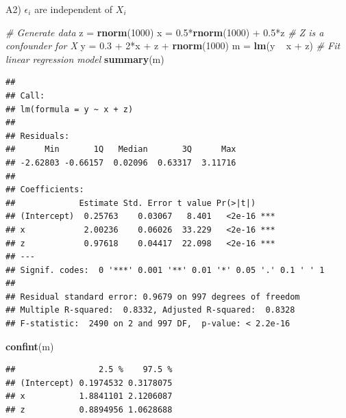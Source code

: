 \documentclass[12pt,ignorenonframetext,]{beamer}
\newenvironment{Shaded}{\begin{snugshade}}{\end{snugshade}}
\newcommand{\KeywordTok}[1]{\textcolor[rgb]{0.13,0.29,0.53}{\textbf{{#1}}}}
\newcommand{\DecValTok}[1]{\textcolor[rgb]{0.00,0.00,0.81}{{#1}}}
\newcommand{\FloatTok}[1]{\textcolor[rgb]{0.00,0.00,0.81}{{#1}}}
\newcommand{\StringTok}[1]{\textcolor[rgb]{0.31,0.60,0.02}{{#1}}}
\newcommand{\CommentTok}[1]{\textcolor[rgb]{0.56,0.35,0.01}{\textit{{#1}}}}
\newcommand{\NormalTok}[1]{{#1}}
\begin{document}
\begin{frame}[fragile]{A2) \(\epsilon_i\) are independent of \(X_i\)}

\tiny

\begin{Shaded}
\begin{Highlighting}[]
\CommentTok{# Generate data}
\NormalTok{z =}\StringTok{ }\KeywordTok{rnorm}\NormalTok{(}\DecValTok{1000}\NormalTok{)}
\NormalTok{x =}\StringTok{ }\FloatTok{0.5}\NormalTok{*}\KeywordTok{rnorm}\NormalTok{(}\DecValTok{1000}\NormalTok{) +}\StringTok{ }\FloatTok{0.5}\NormalTok{*z }\CommentTok{# Z is a confounder for X}
\NormalTok{y =}\StringTok{ }\FloatTok{0.3} \NormalTok{+}\StringTok{ }\DecValTok{2}\NormalTok{*x +}\StringTok{ }\NormalTok{z +}\StringTok{ }\KeywordTok{rnorm}\NormalTok{(}\DecValTok{1000}\NormalTok{)}
\NormalTok{m =}\StringTok{ }\KeywordTok{lm}\NormalTok{(y ~}\StringTok{ }\NormalTok{x +}\StringTok{ }\NormalTok{z) }\CommentTok{# Fit linear regression model}
\KeywordTok{summary}\NormalTok{(m)}
\end{Highlighting}
\end{Shaded}

\begin{verbatim}
## 
## Call:
## lm(formula = y ~ x + z)
## 
## Residuals:
##      Min       1Q   Median       3Q      Max 
## -2.62803 -0.66157  0.02096  0.63317  3.11716 
## 
## Coefficients:
##             Estimate Std. Error t value Pr(>|t|)    
## (Intercept)  0.25763    0.03067   8.401   <2e-16 ***
## x            2.00236    0.06026  33.229   <2e-16 ***
## z            0.97618    0.04417  22.098   <2e-16 ***
## ---
## Signif. codes:  0 '***' 0.001 '**' 0.01 '*' 0.05 '.' 0.1 ' ' 1
## 
## Residual standard error: 0.9679 on 997 degrees of freedom
## Multiple R-squared:  0.8332, Adjusted R-squared:  0.8328 
## F-statistic:  2490 on 2 and 997 DF,  p-value: < 2.2e-16
\end{verbatim}

\begin{Shaded}
\begin{Highlighting}[]
\KeywordTok{confint}\NormalTok{(m)}
\end{Highlighting}
\end{Shaded}

\begin{verbatim}
##                 2.5 %    97.5 %
## (Intercept) 0.1974532 0.3178075
## x           1.8841101 2.1206087
## z           0.8894956 1.0628688
\end{verbatim}

\normalsize

\end{frame}
\end{document}
